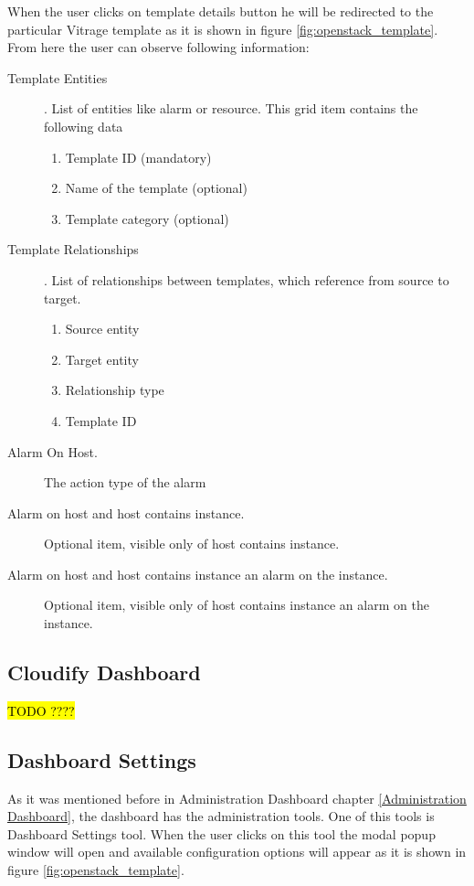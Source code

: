 When the user clicks on template details button he will be redirected to the particular Vitrage template as it is shown in figure \ref{fig:openstack_template}. From here the user can observe following information:
\begin{description}
\item[Template Entities]. List of entities like alarm or resource. This grid item contains the following data
\begin{enumerate}
\item Template ID (mandatory)
\item Name of the template (optional)
\item Template category (optional)
\end{enumerate}
\item[Template Relationships]. List of relationships between templates, which reference from source to target.
\begin{enumerate}
\item Source entity
\item Target entity
\item Relationship type
\item Template ID
\end{enumerate}
\item[Alarm On Host.] The action type of the alarm
\item[Alarm on host and host contains instance.] Optional item, visible only of host contains instance.
\item[Alarm on host and host contains instance an alarm on the instance.] Optional item, visible only of host contains instance an alarm on the instance.

\end{description}



\subsection{Cloudify Dashboard}\label{Cloudify Dashboard}

\hl{TODO ????}

\subsection{Dashboard Settings}\label{Dashboard Settings}
As it was mentioned before in Administration Dashboard chapter \autoref{Administration Dashboard}, the dashboard has the administration tools. One of this tools is Dashboard Settings tool. When the user clicks on this tool the modal popup window will open and available configuration options will appear as it is shown in figure \ref{fig:openstack_template}.

